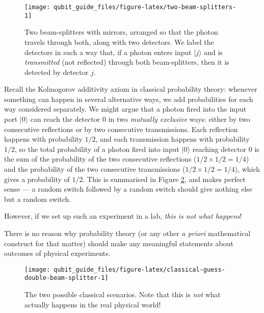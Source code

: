 \documentclass[fleqn]{article}
\newenvironment{idea}{\noindent}{\medskip}
\begin{document}
\begin{figure}[H]

{\centering \texttt{[image: qubit\_guide\_files/figure-latex/two-beam-splitters-1]} 

}

\caption{Two beam-splitters with mirrors, arranged so that the photon travels through both, along with two detectors. We label the detectors in such a way that, if a photon enters input \(|j\rangle\) and is \emph{transmitted} (not reflected) through both beam-splitters, then it is detected by detector \(j\).}\label{fig:two-beam-splitters}
\end{figure}

Recall the Kolmogorov additivity axiom in classical probability theory: whenever something can happen in several alternative ways, we add probabilities for each way considered separately.
We might argue that a photon fired into the input port \(|0\rangle\) can reach the detector \(0\) in two \emph{mutually exclusive} ways: either by two consecutive reflections or by two consecutive transmissions.
Each reflection happens with probability \(1/2\), and each transmission happens with probability \(1/2\), so the total probability of a photon fired into input \(|0\rangle\) reaching detector \(0\) is the sum of the probability of the two consecutive reflections (\(1/2\times 1/2 = 1/4\)) and the probability of the two consecutive transmissions (\(1/2\times 1/2 = 1/4\)), which gives a probability of \(1/2\).
This is summarised in Figure \ref{fig:classical-guess-double-beam-splitter}, and makes perfect sense --- a random switch followed by a random switch should give nothing else but a random switch.

However, if we set up such an experiment in a lab, \emph{this is not what happens}!

\begin{idea}
There is no reason why probability theory (or any other \emph{a priori} mathematical construct for that matter) should make any meaningful statements about outcomes of physical experiments.

\end{idea}



\begin{figure}[H]

{\centering \texttt{[image: qubit\_guide\_files/figure-latex/classical-guess-double-beam-splitter-1]} 

}

\caption{The two possible classical scenarios. Note that this is \emph{not} what actually happens in the real physical world!}\label{fig:classical-guess-double-beam-splitter}
\end{figure}
\end{document}
